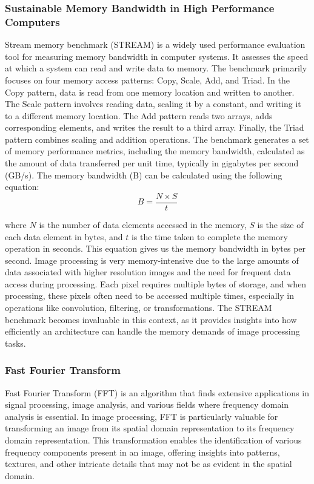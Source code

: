 \subsubsection{Sustainable Memory Bandwidth in High Performance Computers}
 Stream memory benchmark\cite{Macc06} (STREAM) is a widely used performance evaluation tool for measuring memory bandwidth in computer systems. It assesses the speed at which a system can read and write data to memory. The benchmark primarily focuses on four memory access patterns: Copy, Scale, Add, and Triad. In the Copy pattern, data is read from one memory location and written to another. The Scale pattern involves reading data, scaling it by a constant, and writing it to a different memory location. The Add pattern reads two arrays, adds corresponding elements, and writes the result to a third array. Finally, the Triad pattern combines scaling and addition operations. The benchmark generates a set of memory performance metrics, including the memory bandwidth, calculated as the amount of data transferred per unit time, typically in gigabytes per second (GB/s).
 The memory bandwidth (B) can be calculated using the following equation:
\begin{equation}
 B = \frac{N \times S}{t} 
\end{equation}

 where $N$ is the number of data elements accessed in the memory, $S$ is the size of each data element in bytes, and $t$ is the time taken to complete the memory operation in seconds. This equation gives us the memory bandwidth in bytes per second. Image processing is very memory-intensive due to the large amounts of data associated with higher resolution images and the need for frequent data access during processing. Each pixel requires multiple bytes of storage, and when processing, these pixels often need to be accessed multiple times, especially in operations like convolution, filtering, or transformations. The STREAM benchmark becomes invaluable in this context, as it provides insights into how efficiently an architecture can handle the memory demands of image processing tasks.

 \subsubsection{Fast Fourier Transform}
 Fast Fourier Transform (FFT) is an algorithm that finds extensive applications in signal processing, image analysis, and various fields where frequency domain analysis is essential. In image processing, FFT is particularly valuable for transforming an image from its spatial domain representation to its frequency domain representation. This transformation enables the identification of various frequency components present in an image, offering insights into patterns, textures, and other intricate details that may not be as evident in the spatial domain.

